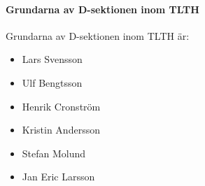 \documentclass{dsekregulations}
\begin{document}
\paragraph{Grundarna av D-sektionen inom TLTH} Grundarna av D-sektionen inom
TLTH är:
\begin{itemize}
\item Lars Svensson
\item Ulf Bengtsson
\item Henrik Cronström
\item Kristin Andersson
\item Stefan Molund
\item Jan Eric Larsson
\end{itemize}
\end{document}
